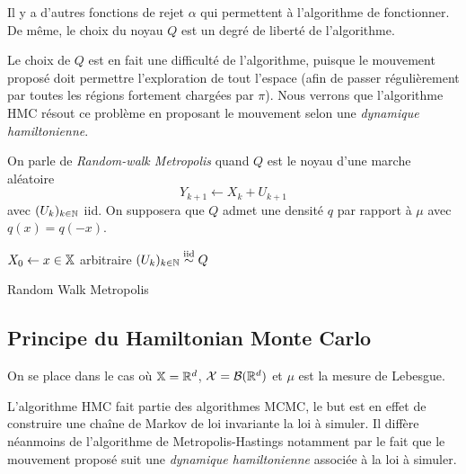 \documentclass[10pt,a4paper]{article}
\begin{document}
\begin{Rque}
  Il y a d'autres fonctions de rejet $\alpha$ qui permettent à l'algorithme de fonctionner. De même, le choix du noyau $Q$ est un degré de liberté de l'algorithme.

  Le choix de $Q$ est en fait une difficulté de l'algorithme, puisque le mouvement proposé doit permettre l'exploration de tout l'espace (afin de passer régulièrement par toutes les régions fortement chargées par $\pi$). Nous verrons que l'algorithme HMC résout ce problème en proposant le mouvement selon une \emph{dynamique hamiltonienne}.
\end{Rque}

\begin{Def}
  On parle de \emph{Random-walk Metropolis} quand $Q$ est le noyau d'une marche aléatoire
  $$Y_{k+1} \leftarrow X_k + U_{k+1}$$
  avec $(U_k)_{k \in \mathbb{N}}$ iid. On supposera que $Q$ admet une densité $q$ par rapport à $\mu$ avec $q(x) = q(-x)$.
\end{Def}

\begin{center}
\begin{algorithm}[H]
  $X_0 \leftarrow x \in \mathbb{X}$ arbitraire\;
  $(U_k)_{k \in \mathbb{N}} \stackrel{\rm iid}{\sim} Q$ \;
  \caption{Random Walk Metropolis}
  \label{algo:metropolis}
\end{algorithm}
\end{center}

\subsection{Principe du Hamiltonian Monte Carlo}

On se place dans le cas où $\mathbb{X} = \mathbb{R}^d$, $\mathcal{X} = \mathcal{B}(\mathbb{R}^d)$ et $\mu$ est la mesure de Lebesgue. 

L'algorithme HMC fait partie des algorithmes MCMC, le but est en effet de construire une chaîne de Markov de loi invariante la loi à simuler. Il diffère néanmoins de l'algorithme de Metropolis-Hastings notamment par le fait que le mouvement proposé suit une \emph{dynamique hamiltonienne} associée à la loi à simuler.
\end{document}

